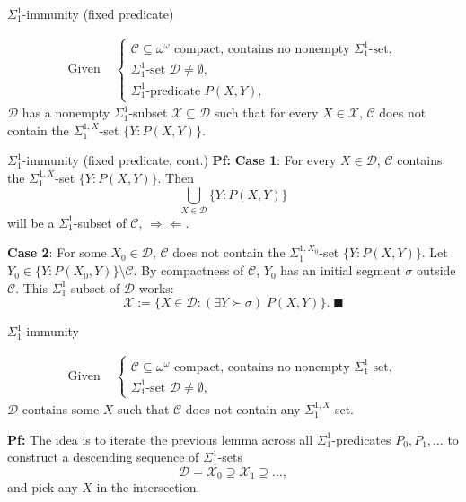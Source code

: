 \begin{frame}{$\Sigma_1^{1}$-immunity (fixed predicate)}
  \begin{lemma*}
    \begin{align*}
      \text{Given } &\begin{cases}
        \mathcal{C}\subseteq\omega^\omega \text{ compact, contains
        no nonempty } \Sigma_1^{1}\text{-set},\\
        \Sigma_1^{1}\text{-set } \mathcal{D}\neq\emptyset,\\
        \Sigma_1^{1}\text{-predicate } P(X,Y),
      \end{cases}
    \end{align*}
    $\mathcal{D}$ has a nonempty $\Sigma_1^{1}$-subset
    $\mathcal{X}\subseteq\mathcal{D}$ such that for every
    $X\in\mathcal{X}$, $\mathcal{C}$ does not contain the
    $\Sigma_1^{1,X}$-set $\{Y:P(X,Y)\}$.
  \end{lemma*}
\end{frame}

\begin{frame}{$\Sigma_1^{1}$-immunity (fixed predicate, cont.)}
  \textbf{Pf:} \textbf{Case 1}: For every $X\in\mathcal{D}$, $\mathcal{C}$
  contains the $\Sigma_1^{1,X}$-set $\{Y:P(X,Y)\}$. Then
  \[\bigcup_{X\in\mathcal{D}} \{Y:P(X,Y)\}\]
  will be a $\Sigma_1^{1}$-subset of $\mathcal{C}$, $\Rightarrow\Leftarrow$.

  \vspace{2em}
  \textbf{Case 2}: For some $X_0\in\mathcal{D}$, $\mathcal{C}$ does not
  contain the $\Sigma_1^{1,X_0}$-set $\{Y:P(X,Y)\}$. Let $Y_0 \in
  \{Y:P(X_0,Y)\} \setminus\mathcal{C}$. By compactness of $\mathcal{C}$,
  $Y_0$ has an initial segment $\sigma$ outside $\mathcal{C}$. This
  $\Sigma_1^{1}$-subset of $\mathcal{D}$ works: \[\mathcal{X}:=
  \{X\in\mathcal{D}: (\exists Y\succ\sigma)\; P(X,Y)\}.\; \blacksquare\]
\end{frame}

\begin{frame}{$\Sigma_1^{1}$-immunity}
  \begin{thm*}
    \begin{align*}
      \text{Given } &\begin{cases}
        \mathcal{C}\subseteq\omega^\omega \text{ compact, contains
        no nonempty } \Sigma_1^{1}\text{-set},\\
        \Sigma_1^{1}\text{-set } \mathcal{D}\neq\emptyset,
      \end{cases}
    \end{align*}
    $\mathcal{D}$ contains some $X$ such that $\mathcal{C}$ does not
    contain any $\Sigma_1^{1,X}$-set.
  \end{thm*}

  \vspace{1em}
  \textbf{Pf:} The idea is to iterate the previous lemma across all
  $\Sigma^1_1$-predicates $P_0,P_1,\ldots$ to construct a descending
  sequence of $\Sigma^1_1$-sets
  \[\mathcal{D} =\mathcal{X}_0 \supseteq\mathcal{X}_1 \supseteq\ldots,\]
  and pick any $X$ in the intersection.
\end{frame}

